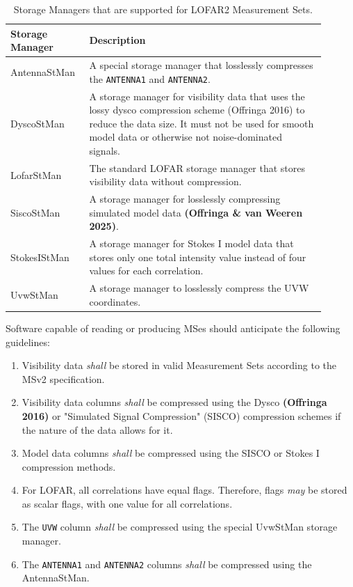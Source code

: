 \documentclass[a4paper,10pt,bibtotoc]{scrartcl}
\begin{document}
\begin{table}[]
    \centering
    \begin{tabular}{p{0.2\linewidth}|p{0.7\linewidth}}
         Storage Manager & Description \\
         \hline
         AntennaStMan & A special storage manager that losslessly compresses the \texttt{ANTENNA1} and \texttt{ANTENNA2}. \\
         DyscoStMan & A storage manager for visibility data that uses the lossy dysco compression  scheme (Offringa 2016) to reduce the data size. It must not be used for smooth model data or otherwise not noise-dominated signals. \\
         LofarStMan & The standard LOFAR storage manager that stores visibility data without compression. \\
         SiscoStMan & A storage manager for losslessly compressing simulated model data \textbf{(Offringa \& van Weeren 2025)}. \\
         StokesIStMan & A storage manager for Stokes I model data that stores only one total intensity value instead of four values for each correlation.\\
         UvwStMan & A storage manager to losslessly compress the UVW coordinates.
    \end{tabular}
    \caption{Storage Managers that are supported for LOFAR2 Measurement Sets.}
    \label{tab:stmans}
\end{table}

Software capable of reading or producing MSes should anticipate the following guidelines:

\begin{enumerate}
    \item Visibility data \textit{shall} be stored in valid Measurement Sets according to the MSv2 specification.
    \item Visibility data columns \textit{shall} be compressed using the Dysco \textbf{(Offringa 2016)} or "Simulated Signal Compression" (SISCO) compression schemes if the nature of the data allows for it.
    \item Model data columns \textit{shall} be compressed using the SISCO or Stokes I compression methods.
    \item For LOFAR, all correlations have equal flags. Therefore, flags \textit{may} be stored as scalar flags, with one value for all correlations.
    \item The \texttt{UVW} column \textit{shall} be compressed using the special UvwStMan storage manager.
    \item The \texttt{ANTENNA1} and \texttt{ANTENNA2} columns \textit{shall} be compressed using the AntennaStMan.
\end{enumerate}
\end{document}
